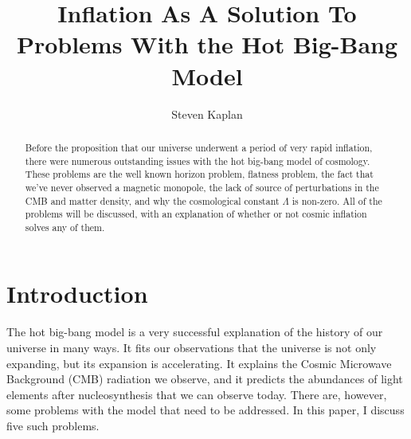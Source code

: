 \documentclass[aps,reprint,prl]{revtex4-1}
\begin{document}
\title{Inflation As A Solution To Problems With the Hot Big-Bang Model}
\author{Steven Kaplan}

\begin{abstract}
Before the proposition that our universe underwent a period of very rapid inflation, there were numerous outstanding issues with the hot big-bang model of cosmology.  These problems are the well known horizon problem, flatness problem, the fact that we've never observed a magnetic monopole, the lack of source of perturbations in the CMB and matter density, and why the cosmological constant $\Lambda$ is non-zero.  All of the problems will be discussed, with an explanation of whether or not cosmic inflation solves any of them.
\end{abstract}

\maketitle
\section*{Introduction}
The hot big-bang model is a very successful explanation of the history of our universe in many ways.  It fits our observations that the universe is not only expanding, but its expansion is accelerating.  It explains the Cosmic Microwave Background (CMB) radiation we observe, and it predicts the abundances of light elements after nucleosynthesis that we can observe today.  There are, however, some problems with the model that need to be addressed.  In this paper, I discuss five such problems.
\end{document}
